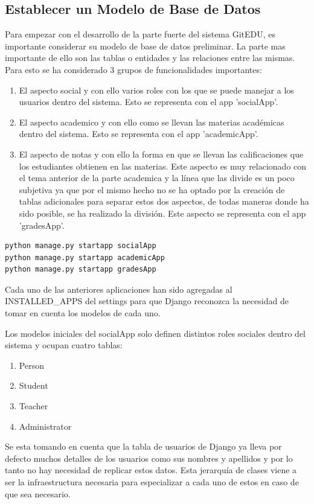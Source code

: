 \subsection{Establecer un Modelo de Base de Datos}
Para empezar con el desarrollo de la parte fuerte del sistema GitEDU, es importante considerar su modelo de base de datos preliminar. La parte mas importante de ello son las tablas o entidades y las relaciones entre las mismas. Para esto se ha considerado 3 grupos de funcionalidades importantes:
\begin{enumerate}
	\item El aspecto social y con ello varios roles con los que se puede manejar a los usuarios dentro del sistema. Esto se representa con el app 'socialApp'.
    \item El aspecto academico y con ello como se llevan las materias académicas dentro del sistema. Esto se representa con el app 'academicApp'.
    \item El aspecto de notas y con ello la forma en que se llevan las calificaciones que los estudiantes obtienen en las materias. Este aspecto es muy relacionado con el tema anterior de la parte academica y la línea que las divide es un poco subjetiva ya que por el mismo hecho no se ha optado por la creación de tablas adicionales para separar estos dos aspectos, de todas maneras donde ha sido posible, se ha realizado la división. Este aspecto se representa con el app 'gradesApp'. 
\end{enumerate}

\begin{lstlisting}
python manage.py startapp socialApp
python manage.py startapp academicApp
python manage.py startapp gradesApp
\end{lstlisting}

Cada uno de las anteriores aplicaciones han sido agregadas al INSTALLED\_APPS del settings para que Django reconozca la necesidad de tomar en cuenta los modelos de cada uno.

Los modelos iniciales del socialApp solo definen distintos roles sociales dentro del sistema y ocupan cuatro tablas:
\begin{enumerate}
	\item Person
	\item Student
	\item Teacher
	\item Administrator
\end{enumerate}
Se esta tomando en cuenta que la tabla de usuarios de Django ya lleva por defecto muchos detalles de los usuarios como sus nombres y apellidos y por lo tanto no hay necesidad de replicar estos datos. Esta jerarquía de clases viene a ser la infraestructura necesaria para especializar a cada uno de estos en caso de que sea necesario.

